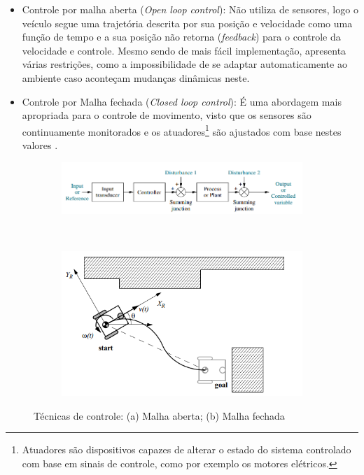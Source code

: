 \begin{itemize}
 \item Controle por malha aberta (\textit{Open loop control}): Não utiliza de sensores, logo o veículo segue uma trajetória descrita por 
 sua posição e velocidade como uma função de tempo e a sua posição não retorna (\textit{feedback}) para o controle da velocidade e 
 controle. Mesmo sendo de mais fácil implementação, apresenta várias restrições, como a impossibilidade de se adaptar 
 automaticamente ao ambiente caso aconteçam mudanças dinâmicas neste.
 
 \item Controle por Malha fechada (\textit{Closed loop control}): É uma abordagem mais apropriada para o controle de movimento, visto que 
os sensores são continuamente monitorados e os atuadores\footnote{Atuadores são dispositivos capazes de alterar 
o estado do sistema controlado com base em sinais de controle, como por exemplo os motores elétricos.} são ajustados com base nestes 
valores \cite{heinen}. 
\end{itemize}

\begin{figure}[h]
    \centering
    \captionsetup{width=0.83\textwidth,font=footnotesize,textfont=bf}
    \begin{subfigure}[b]{0.4\textwidth}
        \includegraphics[width=\textwidth,height=0.2\textheight,keepaspectratio]{figuras/MalhaAberta.png}
        \caption{\centering \label{fig:Malhaaberta}}
    \end{subfigure}
    ~ 
    \begin{subfigure}[b]{0.4\textwidth}
        \includegraphics[width=\textwidth,height=0.2\textheight,keepaspectratio]{figuras/MalhaFechada.png}
        \caption{\centering \label{fig:Malhafechada}}
    \end{subfigure}
    
    \caption{\label{fig:Malhas} Técnicas de controle: (a) Malha aberta; (b) Malha fechada \cite{Intro_auto}} 
\end{figure}


